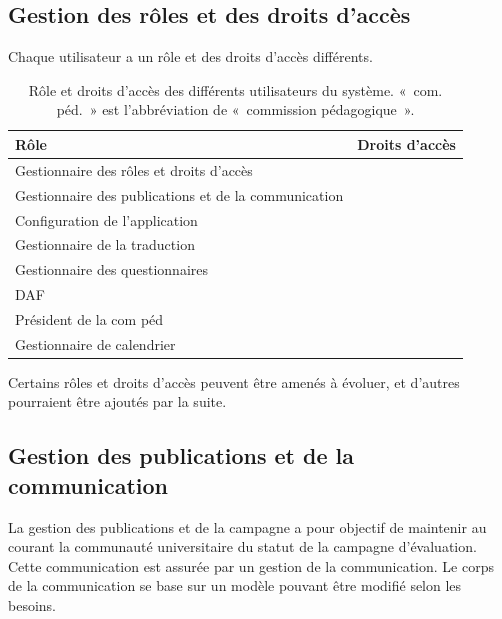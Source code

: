 \documentclass[a4paper,11pt]{report}
\begin{document}
\subsection{Gestion des rôles et des droits d'accès}
Chaque utilisateur a un rôle et des droits d'accès différents.

\begin{table}[ht]
\begin{tabularx}{\textwidth}{|X|l|} \hline
Rôle & Droits d'accès \\ \hline
Gestionnaire des rôles et droits d'accès & \\ \hline
Gestionnaire des publications et de la communication & \\ \hline
Configuration de l'application & \\ \hline
Gestionnaire de la traduction & \\ \hline
Gestionnaire des questionnaires & \\ \hline
DAF & \\ \hline
Président de la com péd & \\ \hline
Gestionnaire de calendrier & \\ \hline

\end{tabularx}
\caption{Rôle et droits d'accès des différents utilisateurs du système. «~com. péd.~» est l'abbréviation de «~commission pédagogique~».}
\label{tab:role-droit}
\end{table}

Certains rôles et droits d'accès peuvent être amenés à évoluer, et d'autres pourraient être ajoutés par la suite.






\subsection{Gestion des publications et de la communication}
La gestion des publications et de la campagne a pour objectif de maintenir au courant la communauté universitaire du statut de la campagne d'évaluation.
Cette communication est assurée par un gestion de la communication.
Le corps de la communication se base sur un modèle pouvant être modifié selon les besoins.
\end{document}
